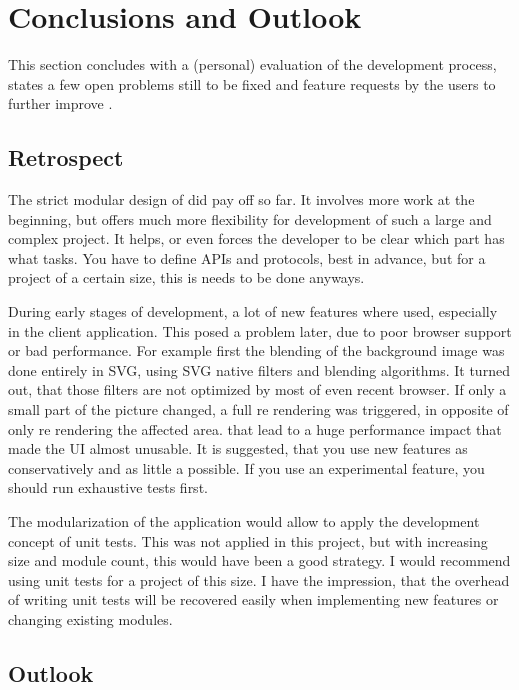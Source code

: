 \section{Conclusions and Outlook}
\label{sec:outlook}

This section concludes with a (personal) evaluation of the development process, states a few open problems still to be fixed and feature requests by the users to further improve \spl.

\subsection{Retrospect}

The strict modular design of \spl did pay off so far.
It involves more work at the beginning, but offers much more flexibility for development of such a large and complex project.
It helps, or even forces the developer to be clear which part has what tasks.
You have to define APIs and protocols, best in advance, but for a project of a certain size, this is needs to be done anyways.

During early stages of development, a lot of new features where used, especially in the client application.
This posed a problem later, due to poor browser support or bad performance.
For example first the blending of the background image was done entirely in SVG, using SVG native filters and blending algorithms.
It turned out, that those filters are not optimized by most of even recent browser.
If only a small part of the picture changed, a full re rendering was triggered, in opposite of only re rendering the affected area. that lead to a huge performance impact that made the UI almost unusable.
It is suggested, that you use new features as conservatively and as little a possible.
If you use an experimental feature, you should run exhaustive tests first.

The modularization of the application would allow to apply the development concept of unit tests.
This was not applied in this project, but with increasing size and module count, this would have been a good strategy.
I would recommend using unit tests for a project of this size.
I have the impression, that the overhead of writing unit tests will be recovered easily when implementing new features or changing existing modules.


\subsection{Outlook}

